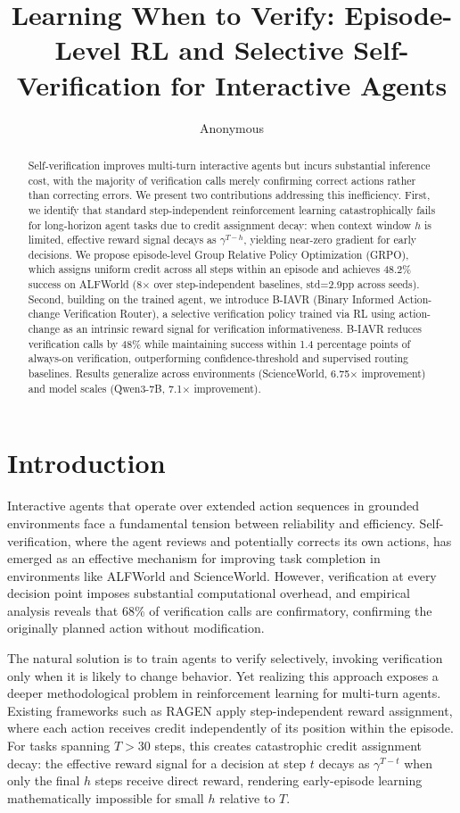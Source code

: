 \documentclass[11pt]{article}
\title{Learning When to Verify: Episode-Level RL and Selective Self-Verification for Interactive Agents}
\author{Anonymous}
\date{}
\begin{document}
\maketitle

\begin{abstract}
Self-verification improves multi-turn interactive agents but incurs substantial inference cost, with the majority of verification calls merely confirming correct actions rather than correcting errors. We present two contributions addressing this inefficiency. First, we identify that standard step-independent reinforcement learning catastrophically fails for long-horizon agent tasks due to credit assignment decay: when context window $h$ is limited, effective reward signal decays as $\gamma^{T-h}$, yielding near-zero gradient for early decisions. We propose episode-level Group Relative Policy Optimization (GRPO), which assigns uniform credit across all steps within an episode and achieves 48.2\% success on ALFWorld (8$\times$ over step-independent baselines, std=2.9pp across seeds). Second, building on the trained agent, we introduce B-IAVR (Binary Informed Action-change Verification Router), a selective verification policy trained via RL using action-change as an intrinsic reward signal for verification informativeness. B-IAVR reduces verification calls by 48\% while maintaining success within 1.4 percentage points of always-on verification, outperforming confidence-threshold and supervised routing baselines. Results generalize across environments (ScienceWorld, 6.75$\times$ improvement) and model scales (Qwen3-7B, 7.1$\times$ improvement).
\end{abstract}

\section{Introduction}

Interactive agents that operate over extended action sequences in grounded environments face a fundamental tension between reliability and efficiency. Self-verification, where the agent reviews and potentially corrects its own actions, has emerged as an effective mechanism for improving task completion in environments like ALFWorld and ScienceWorld. However, verification at every decision point imposes substantial computational overhead, and empirical analysis reveals that 68\% of verification calls are confirmatory, confirming the originally planned action without modification.

The natural solution is to train agents to verify selectively, invoking verification only when it is likely to change behavior. Yet realizing this approach exposes a deeper methodological problem in reinforcement learning for multi-turn agents. Existing frameworks such as RAGEN apply step-independent reward assignment, where each action receives credit independently of its position within the episode. For tasks spanning $T > 30$ steps, this creates catastrophic credit assignment decay: the effective reward signal for a decision at step $t$ decays as $\gamma^{T-t}$ when only the final $h$ steps receive direct reward, rendering early-episode learning mathematically impossible for small $h$ relative to $T$.
\end{document}
